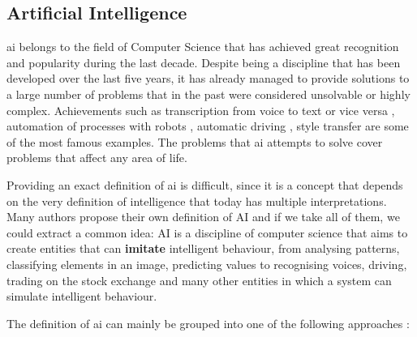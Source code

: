\subsection{Artificial Intelligence}

\acrfull{ai} belongs to the field of Computer Science that has achieved great recognition and popularity during the last decade. Despite being a discipline that has been developed over the last five years, it has already managed to provide solutions to a large number of problems that in the past were considered unsolvable or highly complex. Achievements such as transcription from voice to text \cite{voice2text} or vice versa \cite{text2voice}, automation of processes with robots \cite{robots}, automatic driving \cite{automaticdriving}, style transfer \cite{styletransfer} are some of the most famous examples. The problems that \acrshort{ai} attempts to solve cover problems that affect any area of life.
\newline

Providing an exact definition of \acrshort{ai} is difficult, since it is a concept that depends on the very definition of intelligence that today has multiple interpretations. Many authors propose their own definition of AI \cite{haugeland, bellman, charniak, winston, kurzweil, knight, nilsson} and if we take all of them, we could extract a common idea: AI is a discipline of computer science that aims to create entities that can \textbf{imitate} intelligent behaviour, from analysing patterns, classifying elements in an image, predicting values to recognising voices, driving, trading on the stock exchange and many other entities in which a system can simulate intelligent behaviour.
 \newline
 
The definition of \acrshort{ai} can mainly be grouped into one of the following approaches \cite{amodernapproach}:

